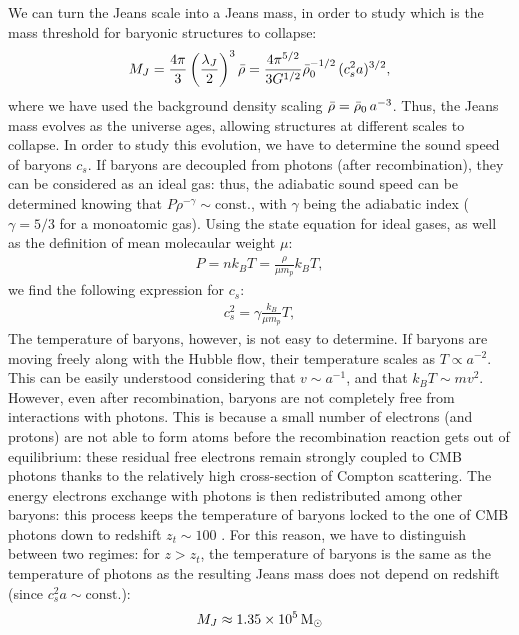 We can turn the Jeans scale into a Jeans mass, in order to study which is the mass threshold for baryonic structures to collapse:
 \begin{align}
   M_J = \frac{4\pi}{3} \left(\frac{\lambda_J}{2}\right)^3\Bar{\rho} = \frac{4\pi^{5/2}}{3G^{1/2}}\Bar{\rho}_0^{-1/2}\,(c_s^2a)^{3/2},
 \end{align}
 where we have used the background density scaling $\Bar{\rho} = \Bar{\rho}_0 \,a^{-3}$. Thus, the Jeans mass evolves as the universe ages, allowing structures at different scales to collapse. In order to study this evolution, we have to determine the sound speed of baryons $c_s$. If baryons are decoupled from photons (after recombination), they can be considered as an ideal gas: thus, the adiabatic sound speed can be determined knowing that $P\rho^{-\gamma}\sim \mathrm{const.}$, with $\gamma$ being the adiabatic index ($\gamma=5/3$ for a monoatomic gas). Using the state equation for ideal gases, as well as the definition of mean molecaular weight $\mu$:
 \begin{align}
   P = nk_BT= \frac{\rho}{\mu m_p}k_B T, \label{eq:state_equation}
 \end{align}
 we find the following expression for $c_s$:
 \begin{align}
   c_s^2 =\gamma \frac{k_B}{\mu m_p} T,
 \end{align}
 The temperature of baryons, however, is not easy to determine. If baryons are moving freely along with the Hubble flow, their temperature scales as $T\propto a^{-2}$. This can be easily understood considering that $v \sim a^{-1}$, and that $k_B T \sim mv^2$. However, even after recombination, baryons are not completely free from interactions with photons. This is because a small number of electrons (and protons) are not able to form atoms before the recombination reaction gets out of equilibrium: these residual free electrons remain strongly coupled to CMB photons thanks to the relatively high cross-section of Compton scattering. The energy electrons exchange with photons is then redistributed among other baryons: this process keeps the temperature of baryons locked to the one of CMB photons down to redshift $z_t \sim 100$ \citep{barkana2005probing}. For this reason, we have to distinguish between two regimes: for $z>z_t$, the temperature of baryons is the same as the temperature of photons as the resulting Jeans mass does not depend on redshift (since $c_s^2 a \sim \mathrm{const.}$):
 \begin{align}
   M_J \approx 1.35\times 10^5 \,{\rm M}_{\odot}
 \end{align}
